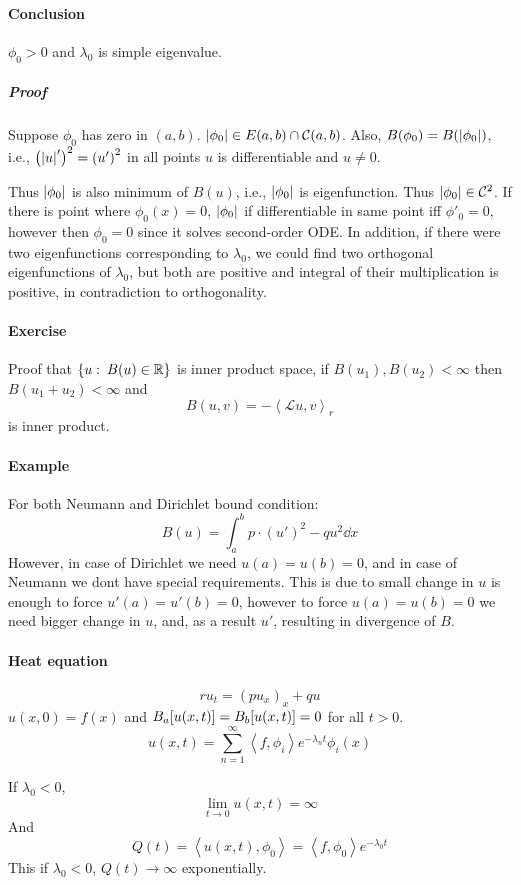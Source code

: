 \paragraph{Conclusion} $\phi_0> 0$ and $\lambda_0$ is simple eigenvalue.
\subparagraph{Proof}
Suppose $\phi_0$ has zero in $(a,b)$. $\abs{ \phi_0} \in E(a,b) \cap \mathcal{C}(a,b)$. Also, $B(\phi_0) = B(\abs{ \phi_0})$, i.e., $\qty(\abs{u}')^2 = \qty(u')^2$ in all points $u$ is differentiable and $u\neq 0$.

Thus $\abs{\phi_0}$ is also minimum of $B(u)$, i.e.,  $\abs{\phi_0}$ is eigenfunction. Thus $\abs{\phi_0}\in \mathcal{C}^2$. If there is point where $\phi_0(x) = 0$, $\abs{\phi_0}$ if differentiable in same point iff $\phi'_0=0$, however then $\phi_0=0$ since it solves second-order ODE. In addition, if there were two eigenfunctions corresponding to $\lambda_0$, we could find two orthogonal eigenfunctions of $\lambda_0$, but both are positive and integral of their multiplication is positive, in contradiction to orthogonality.
\paragraph{Exercise}
Proof that $\qty{u: \: B(u) \in \mathbb{R}}$ is inner product space, if $B(u_1), B(u_2) < \infty $ then $B(u_1+u_2) < \infty $ and 
$$B(u,v) = -\left\langle \mathcal{L}u, v \right\rangle_r $$
is inner product.
\paragraph{Example}
For both Neumann and Dirichlet bound condition:
$$B(u) = \int_a^b  p\cdot (u')^2 - qu^2 \dd{x}$$
However, in case of Dirichlet we need $u(a)=u(b)=0$, and in case of Neumann we dont have special requirements. This is due to small change in $u$ is enough to force $u'(a)=u'(b)=0$, however to force $u(a)=u(b)=0$ we need bigger change in $u$, and, as a result $u'$, resulting in divergence of $B$.
\paragraph{Heat equation}
$$ru_t = (pu_x)_x + qu$$
$u(x,0) = f(x)$ and $B_a\qty[u(x,t)]=B_b\qty[u(x,t)]=0$ for all $t>0$.
$$u(x,t) = \sum_{n=1}^\infty \left\langle f, \phi_i \right\rangle e^{-\lambda_n t} \phi_i(x)$$

If $\lambda_0 < 0$, 
$$\lim_{t\to 0} u(x,t) = \infty$$
And
$$Q(t) = \left\langle u(x,t), \phi_0 \right\rangle = \left\langle f, \phi_0 \right\rangle e^{-\lambda_0 t}$$
This if $\lambda_0 < 0$, $Q(t) \to \infty$ exponentially.
